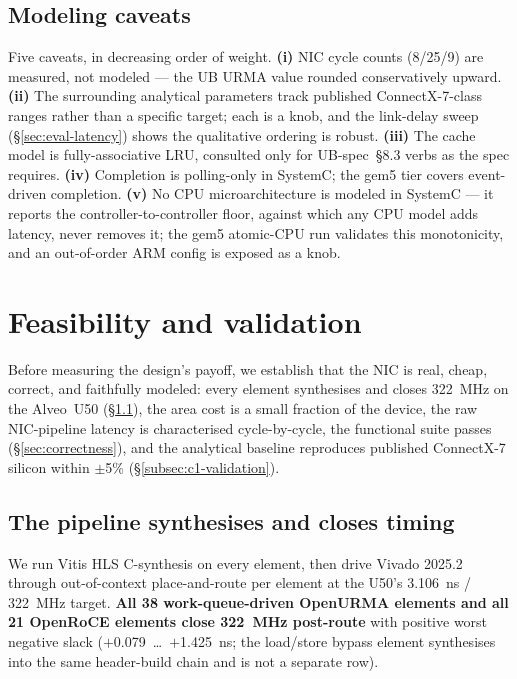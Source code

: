 \documentclass[10pt,twocolumn]{article}
\newcommand{\specsec}[1]{UB-spec~\S#1}
\begin{document}
\subsection{Modeling caveats}
\label{subsec:twonode-caveats}
Five caveats, in decreasing order of weight. \textbf{(i)} NIC cycle
counts (8/25/9) are measured, not modeled --- the UB URMA value
rounded conservatively upward. \textbf{(ii)} The surrounding
analytical parameters track published ConnectX-7-class ranges
rather than a specific target; each is a knob, and the link-delay
sweep (\S\ref{sec:eval-latency}) shows the qualitative ordering is
robust. \textbf{(iii)} The cache model is fully-associative LRU,
consulted only for \specsec{8.3} verbs as the spec requires.
\textbf{(iv)} Completion is polling-only in SystemC; the gem5 tier
covers event-driven completion. \textbf{(v)} No CPU
microarchitecture is modeled in SystemC --- it reports the
controller-to-controller floor, against which any CPU model adds
latency, never removes it; the gem5 atomic-CPU run validates this
monotonicity, and an out-of-order ARM config is exposed as a knob.

\section{Feasibility and validation}
\label{sec:feasibility}

Before measuring the design's payoff, we establish that the NIC is
real, cheap, correct, and faithfully modeled: every element
synthesises and closes 322~MHz on the Alveo~U50 (\S\ref{sec:vivado}),
the area cost is a small fraction of the device, the raw
NIC-pipeline latency is characterised cycle-by-cycle, the functional
suite passes (\S\ref{sec:correctness}), and the analytical baseline
reproduces published ConnectX-7 silicon within $\pm$5\%
(\S\ref{subsec:c1-validation}).

\subsection{The pipeline synthesises and closes timing}
\label{sec:vivado}
We run Vitis HLS C-synthesis on every element, then drive Vivado
2025.2 through out-of-context place-and-route per element at the
U50's 3.106~ns / 322~MHz target. \textbf{All 38 work-queue-driven
OpenURMA elements and all 21 OpenRoCE elements close 322~MHz
post-route} with positive worst negative slack
($+$0.079~\dots~$+$1.425~ns; the load/store bypass element
synthesises into the same header-build chain and is not a separate
row).
\end{document}
